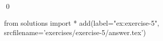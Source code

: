 
\begin{ex} 
  \label{ex:exercise-5}
  
  \qed
\end{ex} 
\begin{python0}
from solutions import *
add(label="ex:exercise-5",
    srcfilename='exercises/exercise-5/answer.tex') 
\end{python0}
